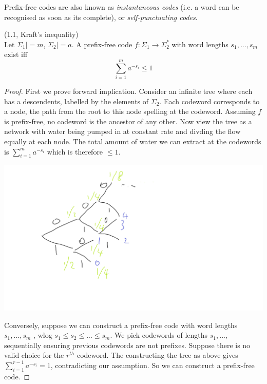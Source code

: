 \documentclass[a4paper]{article}
\begin{document}
Prefix-free codes are also known as \emph{instantaneous codes} (i.e. a word can be recognised as soon as its complete), or \emph{self-punctuating codes}.

\begin{thm} (1.1, Kraft's inequality)\\
Let $\Sigma_1| = m$, $\Sigma_2| = a$. A prefix-free code $f:\Sigma_1 \to \Sigma_2^*$ with word lengths $s_1,...,s_m$ exist iff $$\sum_{i=1}^m a^{-s_i} \leq 1$$
\begin{proof}
First we prove forward implication. Consider an infinite tree where each has a descendents, labelled by the elements of $\Sigma_2$. Each codeword corresponds to a node, the path from the root to this node spelling at the codeword. Assuming $f$ is prefix-free, no codeword is the ancestor of any other. Now view the tree as a network with water being pumped in at constant rate and divding the flow equally at each node. The total amount of water we can extract at the codewords is $\sum_{i=1}^m a^{-s_i}$ which is therefore $\leq 1$.

\includegraphics[scale=0.5]{image/CC_01.png}

Conversely, suppose we can construct a prefix-free code with word lengths $s_1,...,s_m$ , wlog $s_1 \leq s_2 \leq ... \leq s_m$. We pick codewords of lengths $s_1,...,$ sequentially ensuring previous codewords are not prefixes. Suppose there is no valid choice for the $r^{th}$ codeword. The constructing the tree as above gives $\sum_{i=1}^{r-1} a^{-s_i} = 1$, contradicting our assumption. So we can construct a prefix-free code.
\end{proof}
\end{thm}
\end{document}

